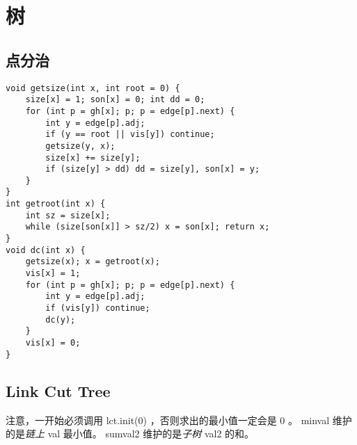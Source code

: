 \documentclass[landscape,a4paper]{article}
\begin{document}
\section{树}

\subsection{点分治}
\begin{lstlisting}
void getsize(int x, int root = 0) {
	size[x] = 1; son[x] = 0; int dd = 0;
	for (int p = gh[x]; p; p = edge[p].next) {
		int y = edge[p].adj;
		if (y == root || vis[y]) continue;
		getsize(y, x);
		size[x] += size[y];
		if (size[y] > dd) dd = size[y], son[x] = y;
	}
}
int getroot(int x) {
	int sz = size[x];
	while (size[son[x]] > sz/2)	x = son[x]; return x;
}
void dc(int x) {
	getsize(x); x = getroot(x);
	vis[x] = 1;
	for (int p = gh[x]; p; p = edge[p].next) {
		int y = edge[p].adj;
		if (vis[y]) continue;
		dc(y);
	}
	vis[x] = 0;
}
\end{lstlisting}
\subsection{Link Cut Tree}

 注意，一开始必须调用 lct.init(0) ，否则求出的最小值一定会是 0 。
 minval 维护的是\emph{链上} val 最小值。
 sumval2 维护的是\emph{子树} val2 的和。
\end{document}
